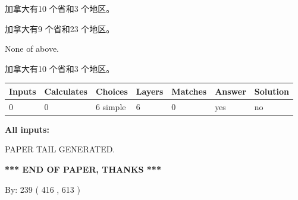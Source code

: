\documentclass{ctexart}
\begin{document}
 
加拿大有10 个省和3 个地区。
 
 
加拿大有9 个省和23 个地区。
 
 
 None of above.
 
 
\noindent{}
 
 
加拿大有10 个省和3 个地区。
 
 
\noindent{}
 
 
   
   
   
   
\noindent\begin{tabular}{|l|l|l|l|l|l|l|}
 \hline
Inputs & Calculates & Choices & Layers & Matches & Answer & Solution \\ \hline
 0  & 
 0  & 
 6
  simple  
  & 
 6  & 
 0  & 
  yes & 
  no 
  \\ \hline
 \end{tabular}
   
   
   
   
\noindent{}
   
   
   
   
\noindent\vspace{0.1in}\hspace{-0.08in} {\textbf{\Large{All inputs: }}}
   
   
   
   
   
   
 \vspace{0.2in}
 
   
   
\vspace{2.0in} PAPER TAIL GENERATED.
   
   
   
   
\vspace{1.0in} 
{\textbf{\large{ *** END OF PAPER, THANKS *** }}} 
   
   
\hspace{1.0in} By: 
 239 ( 416 ,  613 )
   
   
   
   
\newpage 
\setcounter{page}{ 
   571001 } 
   
   
   
\end{document}
